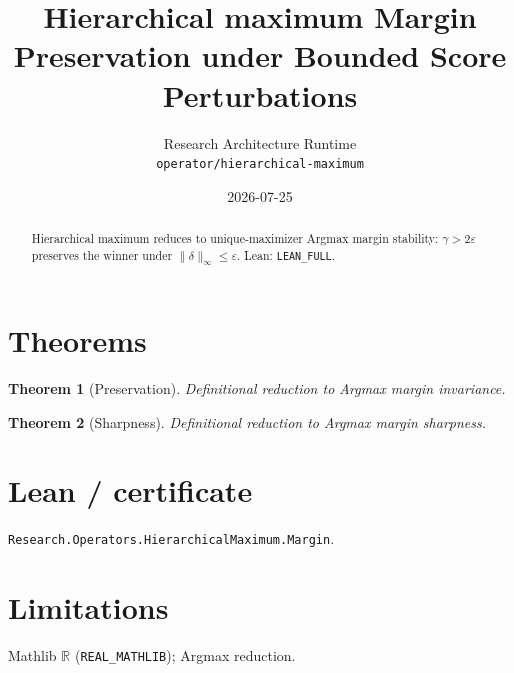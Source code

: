 \documentclass[11pt]{article}
\title{Hierarchical maximum Margin Preservation under Bounded Score Perturbations}
\author{Research Architecture Runtime \\ \texttt{operator/hierarchical-maximum}}
\date{2026-07-25}
\newtheorem{theorem}{Theorem}
\begin{document}
\maketitle
\begin{abstract}
Hierarchical maximum reduces to unique-maximizer Argmax margin stability: $\gamma>2\varepsilon$
preserves the winner under $\|\delta\|_\infty\le\varepsilon$. Lean: \texttt{LEAN\_FULL}.
\end{abstract}
\section{Theorems}
\begin{theorem}[Preservation]
Definitional reduction to Argmax margin invariance.
\end{theorem}
\begin{theorem}[Sharpness]
Definitional reduction to Argmax margin sharpness.
\end{theorem}
\section{Lean / certificate}
\texttt{Research.Operators.HierarchicalMaximum.Margin}.
\section{Limitations}
Mathlib $\mathbb{R}$ (\texttt{REAL\_MATHLIB}); Argmax reduction.
\end{document}

